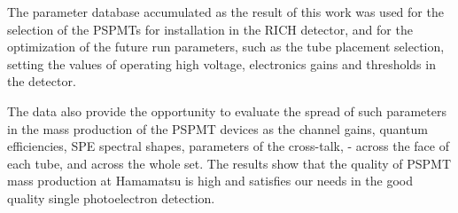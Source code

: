 The parameter database accumulated as the result of this work was used for the selection of the PSPMTs for installation in the RICH detector, and for the optimization of the future run parameters, such as the tube placement selection, setting the values of operating high voltage, electronics gains and thresholds in the detector.


The data also provide the opportunity to evaluate the spread of such parameters in the mass production of the PSPMT devices as the channel gains, quantum efficiencies, SPE spectral shapes, parameters of the cross-talk, - across the face of each tube, and across the whole set. The results show that the quality of PSPMT mass production at Hamamatsu is high and satisfies our needs in the good quality single photoelectron detection.




